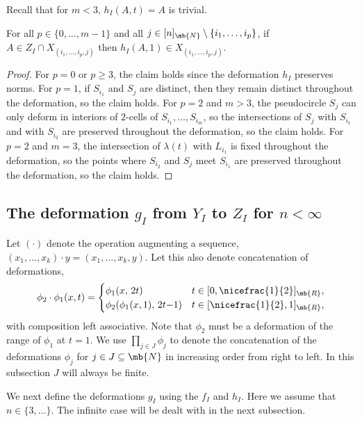 Recall that for $m < 3$, $h_I(A,t) = A$ is trivial.

\begin{claim}\label{claim-stable-h}
For all $p \in \{0,\dots,m{-}1\}$ and all $j \in [n]_\mb{N} \setminus \{i_1,\dots,i_p\}$,
if $A \in Z_I \cap X_{(i_1,\dots,i_{p},j)}$ then $h_I(A,1) \in X_{(i_1,\dots,i_{p},j)}$.
\end{claim}

\begin{proof}
For $p = 0$ or $p \geq 3$, the claim holds since the deformation $h_I$ preserves norms.
For $p = 1$, if $S_{i_1}$ and $S_j$ are distinct, then they remain distinct throughout the deformation, so the claim holds.
For $p = 2$ and $m > 3$, the pseudocircle $S_j$ can only deform in interiors of $2$-cells of $S_{i_1},\dots,S_{i_m}$, so the intersections of $S_j$ with $S_{i_1}$ and with $S_{i_2}$ are preserved throughout the deformation, so the claim holds.
For $p = 2$ and $m = 3$, the intersection of $\lambda(t)$ with $L_{i_1}$ is fixed throughout the deformation, so the points where $S_{i_2}$ and $S_j$ meet $S_{i_1}$ are preserved throughout the deformation, so the claim holds.
\end{proof}

\subsection{The deformation $g_I$ from $Y_I$ to $Z_I$ for $n < \infty$}
\label{subsubsec-g-finite}

Let $(\cdot)$ denote the operation augmenting a sequence, $(x_1, \dots, x_k) \cdot y = (x_1, \dots, x_k, y)$.
Let this also denote concatenation of deformations,
\[\phi_2 \cdot \phi_1 (x,t) =
\begin{cases}
\phi_1(x,\, 2t) & t \in [0, \nicefrac{1}{2}]_\mb{R}, \\
\phi_2(\phi_1(x,1),\, 2t{-}1) & t \in [\nicefrac{1}{2},1]_\mb{R}, \\
\end{cases}
\]
with composition left associative. Note that $\phi_2$ must be a deformation of the range of $\phi_1$ at $t=1$.
We use $\prod_{j \in J} \phi_j$ to denote the concatenation of the deformations $\phi_j$ for $j \in J \subseteq \mb{N}$ in increasing order from right to left.
In this subsection $J$ will always be finite.

We next define the deformations $g_I$ using the $f_I$ and $h_I$.
Here we assume that $n \in \{3,\dots\}$. The infinite case will be dealt with in the next subsection.

